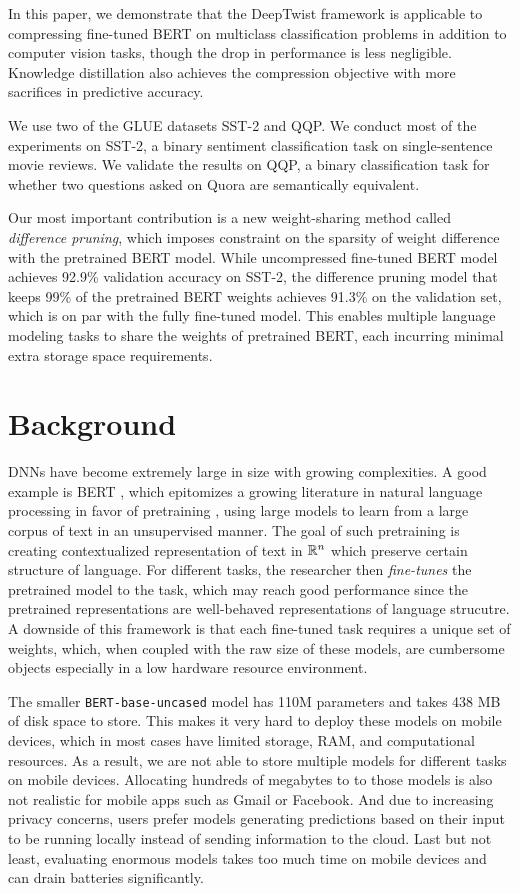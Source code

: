 \documentclass[10pt]{article}
\begin{document}
In this paper, we demonstrate that the DeepTwist framework
\citep{lee2018deeptwist} is applicable to compressing fine-tuned BERT
\citep{devlin2018bert} on multiclass classification problems in addition to
computer vision tasks, though the drop in performance is less negligible.
Knowledge distillation also achieves the compression objective with more
sacrifices in  predictive accuracy.

We use two of the GLUE datasets SST-2 and QQP. We conduct most of the
experiments
on SST-2, a binary sentiment classification task on single-sentence movie
reviews. We validate the results on QQP, a binary classification task for
whether two questions asked on Quora are semantically equivalent.

Our most important contribution is a new weight-sharing method called
\emph{difference pruning}, which imposes constraint on the sparsity of weight
difference with the pretrained BERT model. While uncompressed fine-tuned BERT
model achieves 92.9\% validation accuracy on SST-2, the difference pruning model
that keeps 99\% of the pretrained BERT weights achieves 91.3\% on the validation
set, which is on par with the fully fine-tuned model. This enables multiple
language modeling tasks to share the weights of pretrained BERT, each incurring
minimal extra storage space requirements.

\section{Background}

DNNs have become extremely large in size with growing complexities. A good
example is BERT \citep{devlin2018bert}, which epitomizes a growing
literature in natural language processing in favor of pretraining 
\citep{peters2018deep,radford2018improving,radford2019language},
using large models to learn from a large corpus of text in an unsupervised
manner. The goal of such pretraining is creating contextualized
representation of text in $\mathbb{R}^n$ which preserve certain structure of
language. For different tasks, the researcher then \emph{fine-tunes} the
pretrained model to the task, which may reach good performance since the
pretrained representations are well-behaved representations of language
strucutre. A downside of this framework is that each fine-tuned task
requires a unique set of weights, which, when coupled with the raw size of
these models, are cumbersome objects especially in a low hardware resource
environment.

The smaller \texttt{BERT-base-uncased} model has 110M parameters and takes
438 MB of disk space to store. This
makes it very hard to deploy these models on mobile devices, which in most
cases have limited storage, RAM, and computational resources. As a
result, we are not able to store multiple models for different tasks on mobile
devices. Allocating hundreds of megabytes to to those models is also not
realistic for mobile apps such as Gmail or Facebook. And due to increasing
privacy concerns, users prefer models generating predictions based on their
input to be running locally instead of sending information to the cloud. Last
but not least, evaluating enormous models takes too much time on mobile
devices and can drain batteries significantly.
\end{document}
